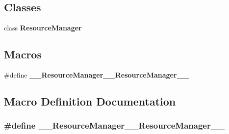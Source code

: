\subsection*{Classes}
\begin{DoxyCompactItemize}
\item 
class {\bf Resource\+Manager}
\end{DoxyCompactItemize}
\subsection*{Macros}
\begin{DoxyCompactItemize}
\item 
\#define {\bf \+\_\+\+\_\+\+Resource\+Manager\+\_\+\+\_\+\+Resource\+Manager\+\_\+\+\_\+}
\end{DoxyCompactItemize}


\subsection{Macro Definition Documentation}
\subsubsection[{\+\_\+\+\_\+\+Resource\+Manager\+\_\+\+\_\+\+Resource\+Manager\+\_\+\+\_\+}]{\setlength{\rightskip}{0pt plus 5cm}\#define \+\_\+\+\_\+\+Resource\+Manager\+\_\+\+\_\+\+Resource\+Manager\+\_\+\+\_\+}\label{_resource_manager_8h_a473308915cd54584b37399efd5be98b5}
